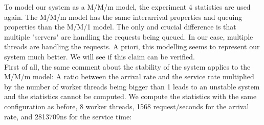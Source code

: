 \documentclass[11pt,a4paper]{article}
\begin{document}
To model our system as a M/M/m model, the experiment 4 statistics are used again.
The M/M/m model has the same interarrival properties and queuing properties than the M/M/1 model. The only and crucial difference is that multiple "servers" are handling the requests being queued. In our case, multiple threads are handling the requests. A priori, this modelling seems to represent our system much better. We will see if this claim can be verified. 
\\
First of all, the same comment about the stability of the system applies to the M/M/m model: A ratio between the arrival rate and the service rate multiplied by the number of worker threads being bigger than 1 leads to an unstable system and the statistics cannot be computed. We compute the statistics with the same configuration as before, 8 worker threads, 1568 request/seconds for the arrival rate, and 2813709ns for the service time:
\end{document}
